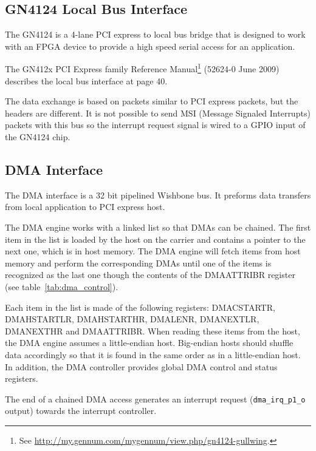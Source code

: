 \documentclass[10pt,a4paper]{cerndoc}
\begin{document}
    \subsection{GN4124 Local Bus Interface}
    
The GN4124 is a 4-lane PCI express to local bus bridge that is designed to work with an FPGA device to provide a high speed serial access for an application.
    
The GN412x PCI Express family Reference Manual\footnote{See \href{http://my.gennum.com/mygennum/view.php/gn4124-gullwing}{http://my.gennum.com/mygennum/view.php/gn4124-gullwing}.} (52624-0 June 2009) describes the local bus interface at page 40.

The data exchange is based on packets similar to PCI express packets, but the headers are different. It is not possible to send MSI (Message Signaled Interrupts) packets with this bus so the interrupt request signal is wired to a GPIO input of the GN4124 chip.
    
    \subsection{DMA Interface}
The DMA interface is a 32 bit pipelined Wishbone bus. It preforms data transfers from local application to PCI express host.

The DMA engine works with a linked list so that DMAs can be chained. The first item in the list is loaded by the host on the carrier and contains a pointer to the next one, which is in host memory. The DMA engine will fetch items from host memory and perform the corresponding DMAs until one of the items is recognized as the last one though the contents of the DMAATTRIBR register (see table~\ref{tab:dma_control}). 

Each item in the list is made of the following registers: DMACSTARTR, DMAHSTARTLR, DMAHSTARTHR, DMALENR, DMANEXTLR, DMANEXTHR and DMAATTRIBR. When reading these items from the host, the DMA engine assumes a little-endian host. Big-endian hosts should shuffle data accordingly so that it is found in the same order as in a little-endian host. In addition, the DMA controller provides global DMA control and status registers.

The end of a chained DMA access generates an interrupt request (\verb+dma_irq_p1_o+ output) towards the interrupt controller.  
\end{document}
